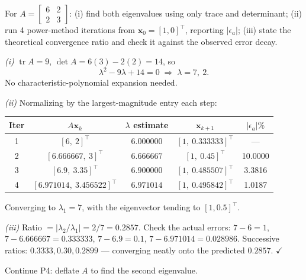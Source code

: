 \begin{probbox}
 For $A = \begin{bmatrix}6&2\\2&3\end{bmatrix}$: (i) find both eigenvalues using only trace and determinant; (ii) run 4 power-method iterations from $\mathbf x_0 = [1,0]^\top$, reporting $|\epsilon_a|$; (iii) state the theoretical convergence ratio and check it against the observed error decay.

\ans \emph{(i)} $\operatorname{tr}A = 9$, $\det A = 6(3)-2(2) = 14$, so
\[
\lambda^2 - 9\lambda + 14 = 0 \;\Longrightarrow\; \lambda = 7,\ 2 .
\]
No characteristic-polynomial expansion needed.

\emph{(ii)} Normalizing by the largest-magnitude entry each step:
\begin{center}\small
\begin{tabular}{@{}ccccc@{}}
\toprule
Iter & $A\mathbf x_k$ & $\lambda$ estimate & $\mathbf x_{k+1}$ & $|\epsilon_a|\%$\\
\midrule
1 & $[6,\ 2]^\top$ & $6.000000$ & $[1,\ 0.333333]^\top$ & ---\\
2 & $[6.666667,\ 3]^\top$ & $6.666667$ & $[1,\ 0.45]^\top$ & 10.0000\\
3 & $[6.9,\ 3.35]^\top$ & $6.900000$ & $[1,\ 0.485507]^\top$ & 3.3816\\
4 & $[6.971014,\ 3.456522]^\top$ & $6.971014$ & $[1,\ 0.495842]^\top$ & 1.0187\\
\bottomrule
\end{tabular}
\end{center}
Converging to $\lambda_1 = 7$, with the eigenvector tending to $[1, 0.5]^\top$.

\emph{(iii)} Ratio $=|\lambda_2/\lambda_1| = 2/7 = 0.2857$. Check the actual errors: $7-6 = 1$, $7-6.666667 = 0.333333$, $7-6.9 = 0.1$, $7-6.971014 = 0.028986$. Successive ratios: $0.3333, 0.30, 0.2899$ --- converging neatly onto the predicted $0.2857$. $\checkmark$

 Continue P4: deflate $A$ to find the second eigenvalue.


\end{probbox}
